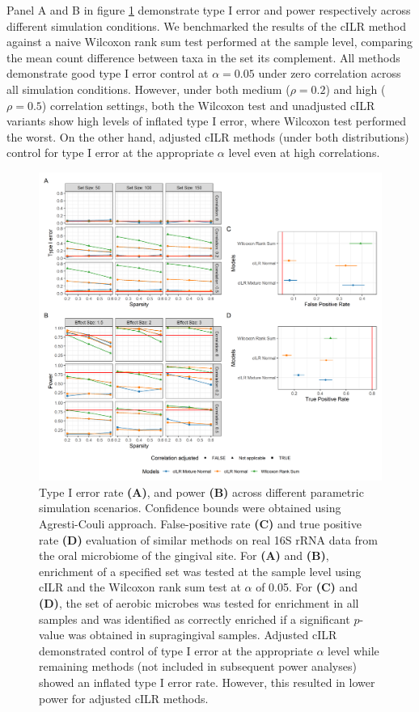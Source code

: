 \documentclass{article}
\begin{document}
Panel A and B in figure \ref{fig:ss_hypo} demonstrate type I error and power respectively across different simulation conditions. We benchmarked the results of the cILR method against a naive Wilcoxon rank sum test performed at the sample level, comparing the mean count difference between taxa in the set its complement. All methods demonstrate good type I error control at $\alpha = 0.05$ under zero correlation across all simulation conditions. However, under both medium ($\rho = 0.2$) and high ($\rho = 0.5$) correlation settings, both the Wilcoxon test and unadjusted cILR variants show high levels of inflated type I error, where Wilcoxon test performed the worst. On the other hand, adjusted cILR methods (under both distributions) control for type I error at the appropriate $\alpha$ level even at high correlations. 

\begin{figure}[H]
    \centering
    \includegraphics[width=\textwidth]{figures/sim_data_ss_hypo.png}
    \caption{Type I error rate \textbf{(A)}, and power \textbf{(B)} across different parametric simulation scenarios. Confidence bounds were obtained using Agresti-Couli \cite{agresti1998} approach. False-positive rate \textbf{(C)} and true positive rate \textbf{(D)} evaluation of similar methods on real 16S rRNA data from the oral microbiome of the gingival site. For \textbf{(A)} and \textbf{(B)}, enrichment of a specified set was tested at the sample level using cILR and the Wilcoxon rank sum test at $\alpha$ of 0.05. For \textbf{(C)} and \textbf{(D)}, the set of aerobic microbes was tested for enrichment in all samples and was identified as correctly enriched if a significant $p$-value was obtained in supragingival samples. Adjusted cILR demonstrated control of type I error at the appropriate $\alpha$ level while remaining methods (not included in subsequent power analyses) showed an inflated type I error rate. However, this resulted in lower power for adjusted cILR methods.}
    \label{fig:ss_hypo}
\end{figure}
\end{document}
